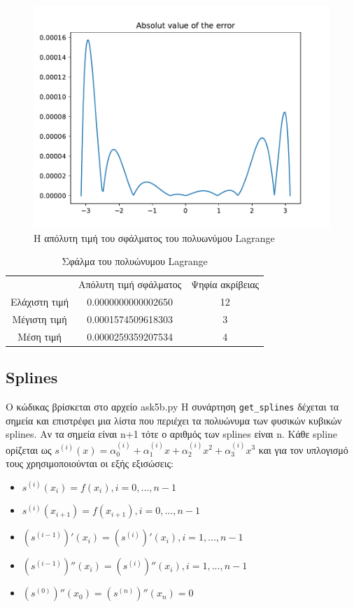 \documentclass[a4paper,11pt]{article}
\newcommand{\lt}{\latintext}
\newcommand{\gt}{\greektext}
\begin{document}
\begin{figure}[h!]
    \centering
    \includegraphics[width=0.8\linewidth]{images/figure5a.pdf}
    \centering
     \caption{Η απόλυτη τιμή του σφάλματος του πολυωνύμου \lt Lagrange}
    \label{fig:fig5a}
\end{figure}

\begin{table}[h]
\centering
\label{fig:table5a}
\begin{tabular}{c c c}
   \gt & Απόλυτη τιμή σφάλματος & Ψηφία ακρίβειας \\
   Ελάχιστη τιμή & 0.0000000000002650 & 12 \\
   Μέγιστη τιμή & 0.0001574509618303 & 3 \\
   Μέση τιμή & 0.0000259359207534 & 4 \\
\end{tabular}
\caption{\gt Σφάλμα του πολυώνυμου \lt Lagrange}
\end{table}

\subsection{\lt Splines}

Ο κώδικας βρίσκεται στο αρχείο \lt ask5b.py \gt Η συνάρτηση \lt \verb|get_splines| \gt δέχεται τα σημεία και επιστρέφει μια λίστα που περιέχει τα πολυώνυμα των φυσικών κυβικών \lt splines. \gt Αν τα σημεία είναι \lt n+1 \gt τότε ο αριθμός των \lt splines \gt είναι \lt n. \gt Κάθε \lt spline \gt ορίζεται ως $s^{(i)}(x)=\alpha_0^{(i)}+\alpha_1^{(i)}x+\alpha_2^{(i)}x^2+\alpha_3^{(i)}x^3$ και για τον υπλογισμό τους χρησιμοποιούνται οι εξής εξισώσεις:

\begin{itemize}
\item $s^{(i)}(x_i)=f(x_i), i=0, ..., n-1$
\item $s^{(i)}(x_{i+1})=f(x_{i+1}), i=0, ..., n-1$
\item $(s^{(i-1)})'(x_{i})=(s^{(i)})'(x_i), i=1, ..., n-1$
\item $(s^{(i-1)})''(x_{i})=(s^{(i)})''(x_i), i=1, ..., n-1$
\item $(s^{(0)})''(x_0)=(s^{(n)})''(x_n)=0$
\end{itemize}
\end{document}
